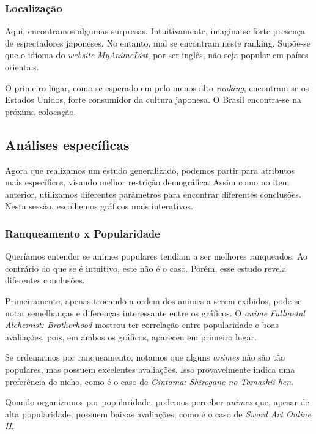 \documentclass{article}
\begin{document}
\subsubsection{Localização}

\quad Aqui, encontramos algumas surpresas. Intuitivamente, imagina-se forte presença de espectadores japoneses. No entanto, mal se encontram neste ranking. Supõe-se que o idioma do \textit{website} \textit{MyAnimeList}, por ser inglês, não seja popular em países orientais.\par

O primeiro lugar, como se esperado em pelo menos alto \textit{ranking}, encontram-se os Estados Unidos, forte consumidor da cultura japonesa. O Brasil encontra-se na próxima colocação.


\subsection{Análises específicas}
\quad Agora que realizamos um estudo generalizado, podemos partir para atributos mais específicos, visando melhor restrição demográfica. Assim como no item anterior, utilizamos diferentes parâmetros para encontrar diferentes conclusões. Nesta sessão, escolhemos gráficos mais interativos. 

\subsubsection{Ranqueamento x Popularidade}

\quad Queríamos entender se animes populares tendiam a ser melhores ranqueados. Ao contrário do que se é intuitivo, este não é o caso. Porém, esse estudo revela diferentes conclusões.\par

Primeiramente, apenas trocando a ordem dos animes a serem exibidos, pode-se notar semelhanças e diferenças interessante entre os gráficos. O \textit{anime} \textit{Fullmetal Alchemist: Brotherhood} mostrou ter correlação entre popularidade e boas avaliações, pois, em ambos os gráficos, apareceu em primeiro lugar.\par

Se ordenarmos por ranqueamento, notamos que alguns \textit{animes} não são tão populares, mas possuem excelentes avaliações. Isso provavelmente indica uma preferência de nicho, como é o caso de \textit{Gintama: Shirogane no Tamashii-hen}.\par
Quando organizamos por popularidade, podemos perceber \textit{animes} que, apesar de alta popularidade, possuem baixas avaliações, como é o caso de \textit{Sword Art Online II}.
\end{document}
